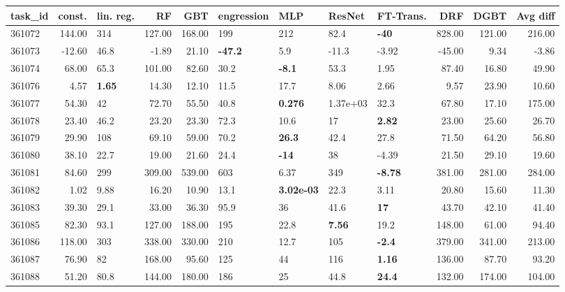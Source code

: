 \begin{table}[ht!]
\centering
\begingroup\footnotesize
\begin{tabular}{lrlrrllllrrr}
  \hline
\hline
task\_id & const. & lin. reg. & RF & GBT & engression & MLP & ResNet & FT-Trans. & DRF & DGBT & Avg diff \\ 
  \hline
361072 & 144.00 & 314 & 127.00 & 168.00 & 199 & 212 & 82.4 & \textbf{-40} & 828.00 & 121.00 & 216.00 \\ 
  361073 & -12.60 & 46.8 & -1.89 & 21.10 & \textbf{-47.2} & 5.9 & -11.3 & -3.92 & -45.00 & 9.34 & -3.86 \\ 
  361074 & 68.00 & 65.3 & 101.00 & 82.60 & 30.2 & \textbf{-8.1} & 53.3 & 1.95 & 87.40 & 16.80 & 49.90 \\ 
  361076 & 4.57 & \textbf{1.65} & 14.30 & 12.10 & 11.5 & 17.7 & 8.06 & 2.66 & 9.57 & 23.90 & 10.60 \\ 
  361077 & 54.30 & 42 & 72.70 & 55.50 & 40.8 & \textbf{0.276} & 1.37e+03 & 32.3 & 67.80 & 17.10 & 175.00 \\ 
  361078 & 23.40 & 46.2 & 23.20 & 23.30 & 72.3 & 10.6 & 17 & \textbf{2.82} & 23.00 & 25.60 & 26.70 \\ 
  361079 & 29.90 & 108 & 69.10 & 59.00 & 70.2 & \textbf{26.3} & 42.4 & 27.8 & 71.50 & 64.20 & 56.80 \\ 
  361080 & 38.10 & 22.7 & 19.00 & 21.60 & 24.4 & \textbf{-14} & 38 & -4.39 & 21.50 & 29.10 & 19.60 \\ 
  361081 & 84.60 & 299 & 309.00 & 539.00 & 603 & 6.37 & 349 & \textbf{-8.78} & 381.00 & 281.00 & 284.00 \\ 
  361082 & 1.02 & 9.88 & 16.20 & 10.90 & 13.1 & \textbf{3.02e-03} & 22.3 & 3.11 & 20.80 & 15.60 & 11.30 \\ 
  361083 & 39.30 & 29.1 & 33.00 & 36.30 & 95.9 & 36 & 41.6 & \textbf{17} & 43.70 & 42.10 & 41.40 \\ 
  361085 & 82.30 & 93.1 & 127.00 & 188.00 & 195 & 22.8 & \textbf{7.56} & 19.2 & 148.00 & 61.00 & 94.40 \\ 
  361086 & 118.00 & 303 & 338.00 & 330.00 & 210 & 12.7 & 105 & \textbf{-2.4} & 379.00 & 341.00 & 213.00 \\ 
  361087 & 76.90 & 82 & 168.00 & 95.60 & 125 & 44 & 116 & \textbf{1.16} & 136.00 & 87.70 & 93.20 \\ 
  361088 & 51.20 & 80.8 & 144.00 & 180.00 & 186 & 25 & 44.8 & \textbf{24.4} & 132.00 & 174.00 & 104.00 \\ 

\end{tabular}
\end{table}
